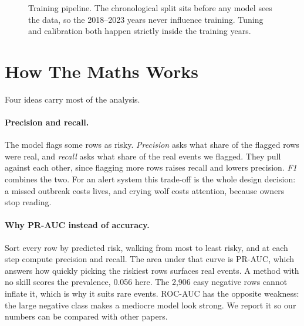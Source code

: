 \documentclass[10pt]{article}
\begin{document}
\begin{figure}[htbp]
\caption{Training pipeline. The chronological split sits before any model sees the
data, so the 2018--2023 years never influence training. Tuning and calibration both
happen strictly inside the training years.}
\label{fig:trainflow}
\end{figure}


\section{How The Maths Works}
\label{sec:maths}

Four ideas carry most of the analysis.

\paragraph{Precision and recall.} The model flags some rows as risky. \emph{Precision}
asks what share of the flagged rows were real, and \emph{recall} asks what share of the real
events we flagged. They pull against each other, since flagging more rows raises recall and
lowers precision. \emph{F1} combines the two. For an alert system this trade-off is the
whole design decision: a missed outbreak costs lives, and crying wolf costs attention,
because owners stop reading.

\paragraph{Why PR-AUC instead of accuracy.} Sort every row by predicted risk, walking from
most to least risky, and at each step compute precision and recall. The area under that
curve is PR-AUC, which answers how quickly picking the riskiest rows surfaces real events. A
method with no skill scores the prevalence, 0.056 here. The 2,906 easy negative rows cannot
inflate it, which is why it suits rare events. ROC-AUC has the opposite weakness: the large
negative class makes a mediocre model look strong. We report it so our numbers can be
compared with other papers.
\end{document}
